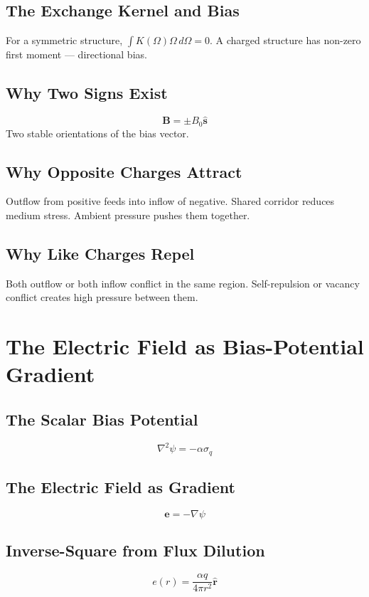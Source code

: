\documentclass[12pt, a4paper]{article}
\begin{document}
\subsection{The Exchange Kernel and Bias}

For a symmetric structure, \( \int K(\Omega) \Omega \, d\Omega = 0 \). A charged structure has non-zero first moment — directional bias.

\subsection{Why Two Signs Exist}
\[
\mathbf{B} = \pm B_0 \hat{\mathbf{s}}
\]
Two stable orientations of the bias vector.

\subsection{Why Opposite Charges Attract}

Outflow from positive feeds into inflow of negative. Shared corridor reduces medium stress. Ambient pressure pushes them together.

\subsection{Why Like Charges Repel}

Both outflow or both inflow conflict in the same region. Self-repulsion or vacancy conflict creates high pressure between them.

\section{The Electric Field as Bias-Potential Gradient}

\subsection{The Scalar Bias Potential}
\[
\nabla^2 \psi = -\alpha \sigma_q
\]

\subsection{The Electric Field as Gradient}
\[
\mathbf{e} = -\nabla \psi
\]

\subsection{Inverse-Square from Flux Dilution}
\[
e(r) = \frac{\alpha q}{4\pi r^2} \hat{\mathbf{r}}
\]
\end{document}

